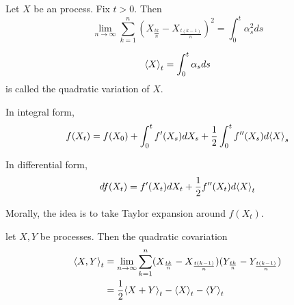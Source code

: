 \begin{thm}
  \label{defn:continuous_time:12}
  Let $X$ be an \ito process.  Fix $t > 0$.  Then
  \begin{equation}
    \label{eq:40}
    \lim_{n \rightarrow \infty} \sum_{k=1}^{n} \left(X_{\frac{tk}{n}}
      - X_{\frac{t(k-1)}{n}}\right)^{2} = \int_{0}^{t} \alpha_{s}^{2} ds
  \end{equation}
\end{thm}

\begin{notation}
  \begin{equation}
    \label{eq:41}
    \IP{ X }_{t} = \int_{0}^{t} \alpha_{s} ds
  \end{equation} is called the quadratic variation of $X$.
\end{notation}

\begin{thm}
  \label{defn:continuous_time:13}
  In integral form,
  \begin{equation}
    \label{eq:42}
    f(X_{t}) = f(X_{0}) + \int_{0}^{t} f'(X_{s}) dX_{s} + \frac{1}{2}
    \int_{0}^{t} f''(X_{s}) d \IP{ X }_{s}
  \end{equation}

  In differential form,
  \begin{equation}
    \label{eq:43}
    df(X_{t}) = f'(X_{t}) dX_{t} + \frac{1}{2} f''(X_{t}) d\IP{ X }_{t}
  \end{equation}
\end{thm}

Morally, the idea is to take Taylor expansion around $f(X_{t})$.

\begin{thm}
  \label{defn:continuous_time:14}
  let $X, Y$ be \ito processes. Then the quadratic covariation
  \begin{align}
    \label{eq:44}
    \IP{ X, Y }_{t} &= \lim_{n \rightarrow \infty}
    \sum_{k=1}^{n} (X_{\frac{tk}{n}} -
    X_{\frac{t(k-1)}{n}})(Y_{\frac{tk}{n}} -
    Y_{\frac{t(k-1)}{n}}) \\
    &= \frac{1}{2} \IP{ X + Y }_{t} - \IP{ X }_{t} -
    \IP{ Y }_{t}
  \end{align}
\end{thm}

